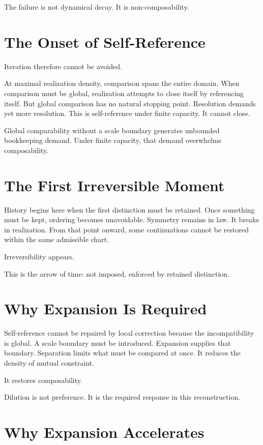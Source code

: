 \documentclass[11pt,twoside,openright]{book}
\begin{document}
The failure is not dynamical decay. It is non-composability.

\section*{The Onset of Self-Reference}

Iteration therefore cannot be avoided.

At maximal realization density, comparison spans the entire domain. When comparison must be global, realization attempts to close itself by referencing itself. But global comparison has no natural stopping point. Resolution demands yet more resolution. This is self-reference under finite capacity. It cannot close.

Global comparability without a scale boundary generates unbounded bookkeeping demand. Under finite capacity, that demand overwhelms composability.

\section*{The First Irreversible Moment}

History begins here when the first distinction must be retained. Once something must be kept, ordering becomes unavoidable. Symmetry remains in law. It breaks in realization. From that point onward, some continuations cannot be restored within the same admissible chart.

Irreversibility appears.

This is the arrow of time: not imposed, enforced by retained distinction.

\section*{Why Expansion Is Required}

Self-reference cannot be repaired by local correction because the incompatibility is global. A scale boundary must be introduced. Expansion supplies that boundary. Separation limits what must be compared at once. It reduces the density of mutual constraint.

It restores composability.

Dilution is not preference. It is the required response in this reconstruction.

\section*{Why Expansion Accelerates}
\end{document}
